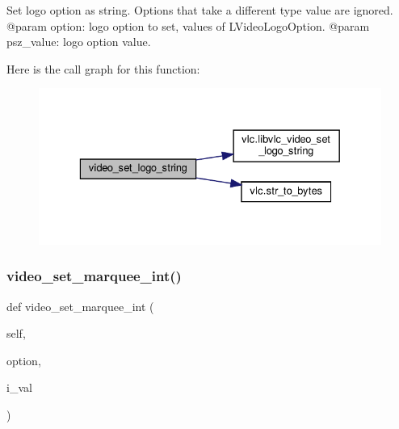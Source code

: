 \begin{DoxyVerb}Set logo option as string. Options that take a different type value
are ignored.
@param option: logo option to set, values of L{VideoLogoOption}.
@param psz_value: logo option value.
\end{DoxyVerb}
 Here is the call graph for this function\+:
\nopagebreak
\begin{figure}[H]
\begin{center}
\leavevmode
\includegraphics[width=329pt]{classvlc_1_1_media_player_a3554b11f8402f4997f5f6fbed1b22bae_cgraph}
\end{center}
\end{figure}
\mbox{\label{classvlc_1_1_media_player_a61a708bed378528147fee7cceb4c4143}} 
\subsubsection{\texorpdfstring{video\+\_\+set\+\_\+marquee\+\_\+int()}{video\_set\_marquee\_int()}}
{\footnotesize\ttfamily def video\+\_\+set\+\_\+marquee\+\_\+int (\begin{DoxyParamCaption}\item[{}]{self,  }\item[{}]{option,  }\item[{}]{i\+\_\+val }\end{DoxyParamCaption})}

